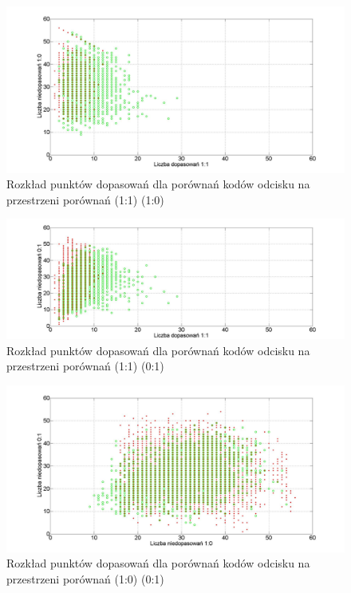 \begin{figure}[!hbt]
    \begin{center}
		\includegraphics[angle=0,scale=0.27]{img/cloud_1.jpg}
		\caption{Rozkład punktów dopasowań dla porównań kodów odcisku na przestrzeni porównań (1:1) (1:0)}
		\label{img:cloud_1}
    \end{center}
\end{figure} 

\begin{figure}[!hbt]
    \begin{center}
		\includegraphics[angle=0,scale=0.27]{img/cloud_2.jpg}
		\caption{Rozkład punktów dopasowań dla porównań kodów odcisku na przestrzeni porównań (1:1) (0:1)}
		\label{img:cloud_2}
    \end{center}
\end{figure} 

\begin{figure}[!hbt]
    \begin{center}
		\includegraphics[angle=0,scale=0.27]{img/cloud_3.jpg}
		\caption{Rozkład punktów dopasowań dla porównań kodów odcisku na przestrzeni porównań (1:0) (0:1)}
		\label{img:cloud_3}
	\end{center}
\end{figure} 